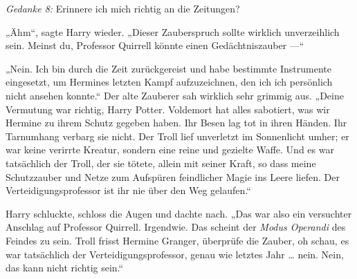 \emph{Gedanke 8:} Erinnere ich mich richtig an die Zeitungen?

„Ähm“, sagte Harry wieder.
„Dieser Zauberspruch sollte wirklich unverzeihlich sein. Meinst du, Professor Quirrell könnte einen Gedächtniszauber —“

„Nein. Ich bin durch die Zeit zurückgereist und habe bestimmte Instrumente eingesetzt, um Hermines letzten Kampf aufzuzeichnen, den ich ich persönlich nicht ansehen konnte.“ Der alte Zauberer sah wirklich sehr grimmig aus.
„Deine Vermutung war richtig, Harry Potter. Voldemort hat alles sabotiert, was wir Hermine zu ihrem Schutz gegeben haben. Ihr Besen lag tot in ihren Händen. Ihr Tarnumhang verbarg sie nicht. Der Troll lief unverletzt im Sonnenlicht umher; er war keine verirrte Kreatur, sondern eine reine und gezielte Waffe. Und es war tatsächlich der Troll, der sie tötete, allein mit seiner Kraft, so dass meine Schutzzauber und Netze zum Aufspüren feindlicher Magie ins Leere liefen. Der Verteidigungsprofessor ist ihr nie über den Weg gelaufen.“

Harry schluckte, schloss die Augen und dachte nach.
„Das war also ein versuchter Anschlag auf Professor Quirrell. Irgendwie. Das scheint der \emph{Modus Operandi} des Feindes zu sein. Troll frisst Hermine Granger, überprüfe die Zauber, oh schau, es war tatsächlich der Verteidigungsprofessor, genau wie letztes Jahr … nein. Nein, das kann nicht richtig sein.“

